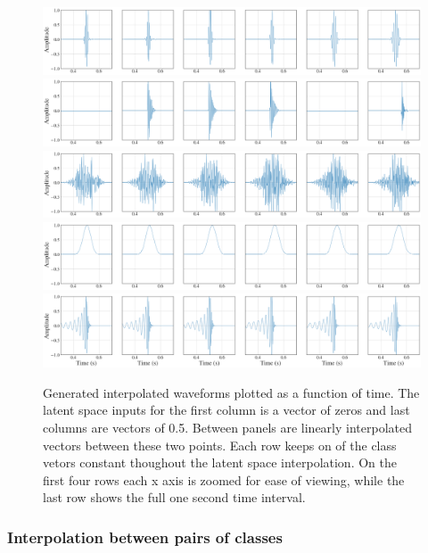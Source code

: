 \documentclass[12pt]{iopart}
\begin{document}
\begin{figure}
    \centering
    \includegraphics[width=\textwidth]{figures/generations/z_interp_sg.png}
    \includegraphics[width=\textwidth]{figures/generations/z_interp_rd.png}
    \includegraphics[width=\textwidth]{figures/generations/z_interp_wnb.png}
    \includegraphics[width=\textwidth]{figures/generations/z_interp_blip.png}
    \includegraphics[width=\textwidth]{figures/generations/z_interp_bbh.png}
    \caption{Generated interpolated waveforms plotted as a function of time. The latent space inputs for the first  column is a vector of zeros and last columns are vectors of 0.5. Between panels are linearly interpolated vectors between these two points. Each row keeps on of the class vetors constant thoughout the latent space interpolation. On the first four rows each x axis is zoomed for ease of viewing, while the last row shows the full one second time interval.}
    \label{fig:z_interp}
\end{figure}

\subsubsection{Interpolation between pairs of classes}
\end{document}
